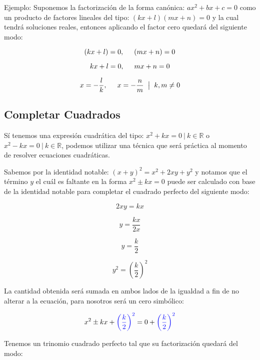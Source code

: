\documentclass[A4paper, 10pt, oneside]{book}
\begin{document}
	\vspace{5mm}
	
	Ejemplo: Suponemos la factorización de la forma canónica: $ax^2+bx+c=0$ como un producto de factores lineales del tipo: $(kx+l)(mx+n)=0$ y la cual tendrá soluciones reales, entonces aplicando el factor cero quedará del siguiente modo:
	
	$$(kx+l)=0, \hspace{5mm} (mx+n)=0$$
	
	$$kx+l=0, \hspace{5mm} mx+n=0$$
	
	$$x=-\frac{l}{k}, \hspace{5mm} x=-\frac{n}{m} \hspace{2mm} \big| \hspace{2mm}  k, m \neq 0$$
	
	\subsection{Completar Cuadrados}
	
	Sí tenemos una expresión cuadrática del tipo: $x^2+kx=0 \ | \ k \in \mathbb{R}$ o $x^2-kx=0 \ | \ k \in \mathbb{R}$, podemos utilizar una técnica que será práctica al momento de resolver ecuaciones cuadráticas.\newline
	
	Sabemos por la identidad notable: $(x+y)^2=x^2+2xy+y^2$ y notamos que el término $y$ el cuál es faltante en la forma $x^2\pm kx=0$ puede ser calculado con base de la identidad notable para completar el cuadrado perfecto del siguiente modo:\newline
	
	$$2xy = kx$$
	
	$$y=\frac{kx}{2x}$$
	
	$$y=\frac{k}{2}$$
	
	$$y^2=\left(\frac{k}{2}\right)^2$$\newline
	
	La cantidad obtenida será sumada en ambos lados de la igualdad a fin de no alterar a la ecuación, para nosotros será un cero simbólico:\newline
	
	$$x^2\pm kx+{\color{blue}\left(\frac{k}{2}\right)^2}=0+{\color{blue}\left(\frac{k}{2}\right)^2}$$\newline
	
	Tenemos un trinomio cuadrado perfecto tal que su factorización quedará del modo:\newline
	
\end{document}
